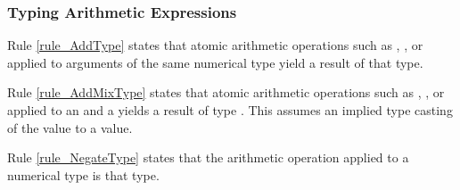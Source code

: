 \subsubsection{Typing Arithmetic Expressions} 
Rule \ref{rule_AddType} states that atomic arithmetic operations
such as , ,  or  applied
to arguments of the same numerical type  yield a result of that type.

Rule \ref{rule_AddMixType} states that atomic arithmetic operations
such as , ,  or  applied
to an  and a  yields a result of type .
This assumes an implied type casting of the  value to a  value.


Rule \ref{rule_NegateType} states that the arithmetic operation  applied
to a numerical type is that type.

